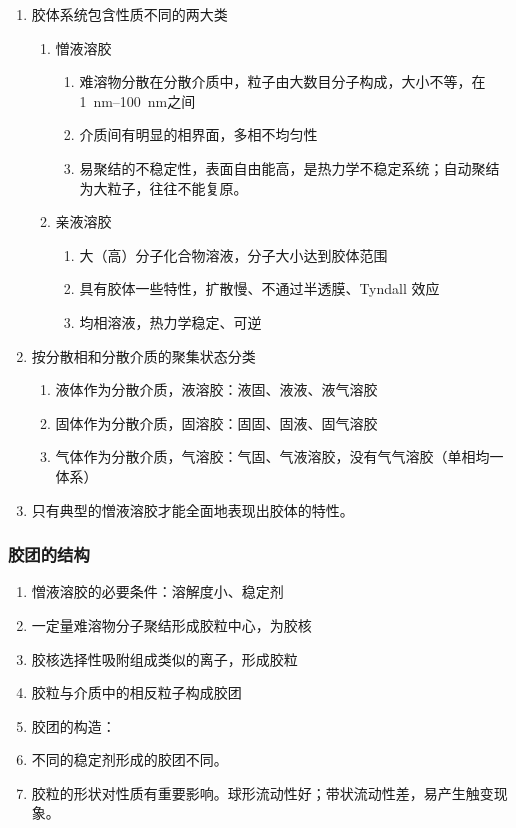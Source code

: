 \begin{enumerate}
    \item 胶体系统包含性质不同的两大类
    \begin{enumerate}
        \item 憎液溶胶
        \begin{enumerate}
            \item 难溶物分散在分散介质中，粒子由大数目分子构成，大小不等，在\qtyrange{1}{100}{\nano\meter}之间
            \item 介质间有明显的相界面，多相不均匀性
            \item 易聚结的不稳定性，表面自由能高，是热力学不稳定系统；自动聚结为大粒子，往往不能复原。
        \end{enumerate}
        \item 亲液溶胶
        \begin{enumerate}
            \item 大（高）分子化合物溶液，分子大小达到胶体范围
            \item 具有胶体一些特性，扩散慢、不通过半透膜、Tyndall 效应
            \item 均相溶液，热力学稳定、可逆
        \end{enumerate}
    \end{enumerate}
    \item 按分散相和分散介质的聚集状态分类
    \begin{enumerate}
        \item 液体作为分散介质，液溶胶：液固、液液、液气溶胶
        \item 固体作为分散介质，固溶胶：固固、固液、固气溶胶
        \item 气体作为分散介质，气溶胶：气固、气液溶胶，没有气气溶胶（单相均一体系）
    \end{enumerate}
    \item 只有典型的憎液溶胶才能全面地表现出胶体的特性。
\end{enumerate}
\subsubsection{胶团的结构}

\begin{enumerate}
    \item 憎液溶胶的必要条件：溶解度小、稳定剂
    \item 一定量难溶物分子聚结形成胶粒中心，为胶核
    \item 胶核选择性吸附组成类似的离子，形成胶粒
    \item 胶粒与介质中的相反粒子构成胶团
    \item {} 胶团的构造： %
    \item 不同的稳定剂形成的胶团不同。
    \item 胶粒的形状对性质有重要影响。球形流动性好；带状流动性差，易产生触变现象。
\end{enumerate}

